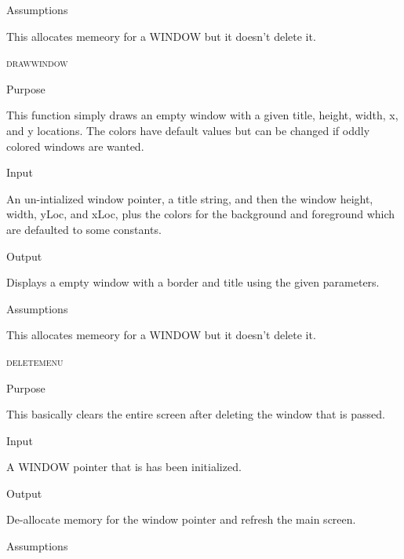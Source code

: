 \documentclass[pdftex, 11pt]{article}
\begin{document}
\begin{description}
\begin{description}
			\item{Assumptions}

				This allocates memeory for a WINDOW but it doesn't delete it.

		\end{description}


	\item{\textsc{drawwindow}}

		\begin{description}
			\item{Purpose}

				This function simply draws an empty window with a given title, height, width,
				x, and y locations.  The colors have default values but can be changed if
				oddly colored windows are wanted.

			\item{Input}

				An un-intialized window pointer, a title string, and then
				the window height, width, yLoc, and xLoc, plus the colors
				for the background and foreground which are defaulted to some constants.

			\item{Output}

				Displays a empty window with a border and title using the
				given parameters.

			\item{Assumptions}

				This allocates memeory for a WINDOW but it doesn't delete it.

		\end{description}


	\item{\textsc{deletemenu}}

		\begin{description}
			\item{Purpose}

				This basically clears the entire screen after deleting the window that is
				passed.

			\item{Input}

				A WINDOW pointer that is has been initialized.

			\item{Output}

				De-allocate memory for the window pointer and refresh the
				main screen.

			\item{Assumptions}


\end{description}
\end{description}
\end{document}
